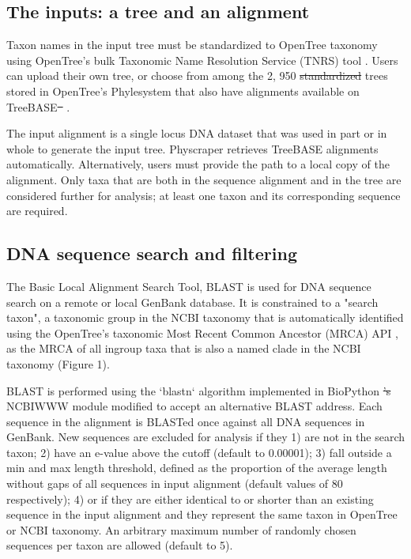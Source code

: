 \documentclass{bmcart}
\providecommand{\DIFaddtex}[1]{{\protect\color{blue}\uwave{#1}}} %
\providecommand{\DIFdeltex}[1]{{\protect\color{red}\sout{#1}}}                      %
\providecommand{\DIFaddbegin}{} %
\providecommand{\DIFaddend}{} %
\providecommand{\DIFdelbegin}{} %
\providecommand{\DIFdelend}{} %
\providecommand{\DIFadd}[1]{\texorpdfstring{\DIFaddtex{#1}}{#1}} %
\providecommand{\DIFdel}[1]{\texorpdfstring{\DIFdeltex{#1}}{}} %
\begin{document}
\subsection*{The inputs: a tree and an alignment}

Taxon names in the input tree must be standardized to OpenTree taxonomy
\cite{rees2017automated} using OpenTree's bulk Taxonomic Name Resolution Service
(TNRS) tool \cite{TNRStool}. Users can upload their
own tree, or choose from among the 2, 950 \DIFdelbegin \DIFdel{standardized }\DIFdelend \DIFaddbegin \DIFadd{curated }\DIFaddend trees stored in OpenTree's
Phylesystem \DIFaddbegin \DIFadd{database }\DIFaddend \cite{phylesystemGithub, mctavish2015phylesystem} that also have
alignments available on TreeBASE\DIFdelbegin \DIFdel{\mbox{%
\cite{piel2009treebase}}\hspace{0pt}%
}\DIFdelend .

The input alignment is a single locus DNA dataset that was used in part or in
whole to generate the input tree. Physcraper retrieves TreeBASE alignments
automatically. Alternatively, users must provide the path to a local copy of the
alignment.
Only taxa that are both in the sequence alignment and in the tree are considered
further for analysis; at least one taxon and its corresponding sequence are required.

\subsection*{DNA sequence search and filtering}

The Basic Local Alignment Search Tool, BLAST \cite{altschul1990basic} is used for DNA
sequence search on a remote or local GenBank database. It is constrained to a
"search taxon", a taxonomic group in the NCBI taxonomy that is automatically
identified using the OpenTree's taxonomic Most Recent Common Ancestor (MRCA) API
\cite{mrcaAPI, rees2017automated}, as the MRCA of all ingroup taxa that is
also a named clade in the NCBI taxonomy (Figure 1).

BLAST is performed using the `blastn` algorithm \cite{camacho2009blast}
implemented in BioPython \DIFdelbegin \DIFdel{'s }\DIFdelend \DIFaddbegin \DIFadd{1.71 }\DIFaddend \cite{cock2009biopython} NCBIWWW module \cite{ncbiwww}
modified to accept an alternative BLAST address.
Each sequence in the alignment is BLASTed once against all DNA sequences in GenBank.
New sequences are excluded for analysis if they 1) are not in the search taxon;
2) have an e-value above the cutoff (default to 0.00001); 3) fall outside a min
and max length threshold, defined as the proportion of the average length without
gaps of all sequences in input alignment (default values of 80%
\DIFaddbegin \DIFadd{\% and 120\%,
}\DIFaddend respectively); 4) or if they are either identical to or shorter than an existing
sequence in the input alignment and they represent the same taxon in OpenTree or
NCBI taxonomy.
An arbitrary maximum number of randomly chosen sequences per taxon are allowed
(default to 5).
\end{document}
